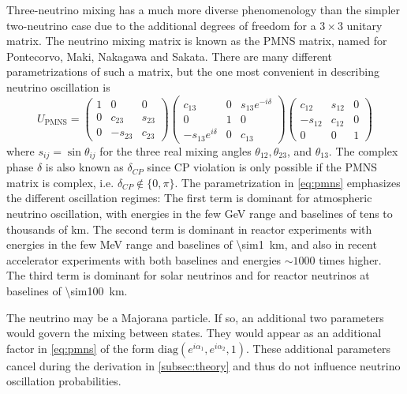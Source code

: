 Three-neutrino mixing has a much more diverse phenomenology
than the simpler two-neutrino case
due to the additional degrees of freedom for a $3\times3$ unitary matrix.
The neutrino mixing matrix is known as the PMNS matrix,
named for Pontecorvo, Maki, Nakagawa and Sakata.
There are many different parametrizations of such a matrix,
but the one most convenient in describing neutrino oscillation is
\begin{equation}\label{eq:pmns}
    U_{\text{PMNS}} =
    \begin{pmatrix}
        1 & 0 & 0 \\
        0 & c_{23} & s_{23} \\
        0 & -s_{23} & c_{23}
    \end{pmatrix}
    \begin{pmatrix}
        c_{13} & 0 & s_{13}e^{-i\delta} \\
        0 & 1 & 0 \\
        -s_{13}e^{i\delta} & 0 & c_{13}
    \end{pmatrix}
    \begin{pmatrix}
        c_{12} & s_{12} & 0 \\
        -s_{12} & c_{12} & 0 \\
        0 & 0 & 1
    \end{pmatrix}
\end{equation}
where $s_{ij} = \sin\theta_{ij}$ for the three real mixing angles
$\theta_{12},\theta_{23}$, and $\theta_{13}$.
The complex phase $\delta$ is also known as $\delta_{CP}$
since CP violation is only possible if the PMNS matrix is complex,
i.e. $\delta_{CP} \notin \{0, \pi\}$.
The parametrization in \cref{eq:pmns} emphasizes the different oscillation regimes:
The first term is dominant for atmospheric neutrino oscillation,
with energies in the few \si{\GeV} range
and baselines of tens to thousands of \si{\km}.
The second term is dominant in reactor experiments
with energies in the few \si{\MeV} range
and baselines of \SI{\sim1}{\km},
and also in recent accelerator experiments
with both baselines and energies $\sim1000$ times higher.
The third term is dominant for solar neutrinos
and for reactor neutrinos at baselines of \SI{\sim100}{\km}.

The neutrino may be a Majorana particle.
If so, an additional two parameters %
would govern the mixing between states.
They would appear as an additional factor in \cref{eq:pmns}
of the form $\text{diag}(e^{i\alpha_1}, e^{i\alpha_2}, 1)$.
These additional parameters cancel
during the derivation in \cref{subsec:theory}
and thus do not influence neutrino oscillation probabilities.

